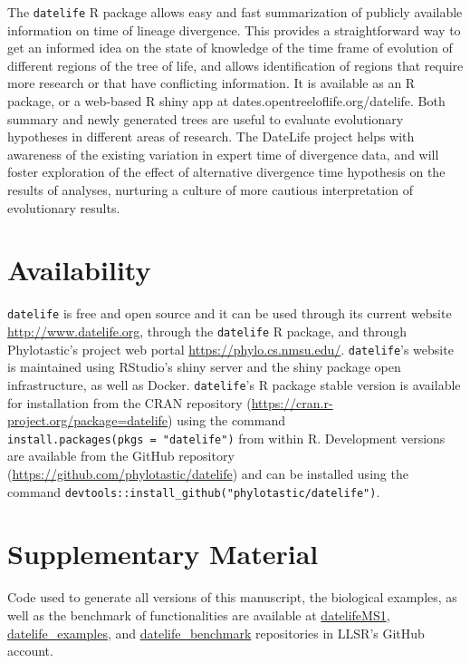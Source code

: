 \documentclass[
  english,
  man]{apa6}
\begin{document}
The \texttt{datelife} R package allows easy and fast summarization of publicly available information
on time of lineage divergence. This provides a straightforward way to get an informed idea on the state of knowledge of the time frame of evolution of different regions of the tree of life, and allows identification of regions that require more research or that have conflicting information.
It is available as an R package, or a web-based R shiny app at dates.opentreeloflife.org/datelife.
Both summary and newly generated trees are useful to evaluate evolutionary hypotheses in different areas of research. The DateLife project helps with awareness of the existing variation in expert time of divergence data, and will foster exploration of the effect of alternative divergence time hypothesis on the results of analyses, nurturing a culture of more cautious interpretation of evolutionary results.

\hypertarget{availability}{%
\section{Availability}\label{availability}}

\texttt{datelife} is free and open source and it can be used through its current website
\url{http://www.datelife.org}, through the \texttt{datelife} R package, and through Phylotastic's project web portal \url{https://phylo.cs.nmsu.edu/}.
\texttt{datelife}'s website is maintained using RStudio's shiny server and the shiny package open infrastructure, as well as Docker.
\texttt{datelife}'s R package stable version is available
for installation from the CRAN repository (\url{https://cran.r-project.org/package=datelife})
using the command \texttt{install.packages(pkgs\ =\ "datelife")} from within R. Development versions
are available from the GitHub repository (\url{https://github.com/phylotastic/datelife})
and can be installed using the command \texttt{devtools::install\_github("phylotastic/datelife")}.

\hypertarget{supplementary-material}{%
\section{Supplementary Material}\label{supplementary-material}}

Code used to generate all versions of this manuscript, the biological examples, as well as the benchmark of functionalities are available at \href{https://github.com/LunaSare/datelifeMS1}{datelifeMS1}, \href{https://github.com/LunaSare/datelife_examples}{datelife\_examples}, and \href{https://github.com/LunaSare/datelife_benchmark}{datelife\_benchmark} repositories in LLSR's GitHub account.
\end{document}
